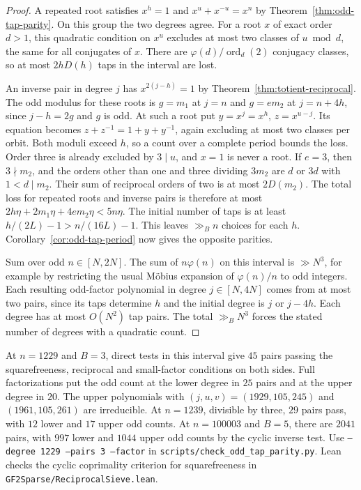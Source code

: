 \documentclass[11pt]{article}
\newcommand{\ord}{\operatorname{ord}}
\begin{document}
\begin{proof}
A repeated root satisfies \(x^h=1\) and
\(x^u+x^{-u}=x^n\) by Theorem~\ref{thm:odd-tap-parity}. On this
group the two degrees agree. For a root \(x\) of exact order
\(d>1\), this quadratic condition on \(x^u\) excludes at most
two classes of \(u\bmod d\), the same for all conjugates of \(x\).
There are \(\varphi(d)/\ord_d(2)\) conjugacy classes, so at most
\(2hD(h)\) taps in the interval are lost.

An inverse pair in degree \(j\) has \(x^{2(j-h)}=1\) by
Theorem~\ref{thm:totient-reciprocal}. The odd modulus for these
roots is \(g=m_1\) at \(j=n\) and \(g=e m_2\) at \(j=n+4h\),
since \(j-h=2g\) and \(g\) is odd. At such a root put
\(y=x^j=x^h\), \(z=x^{u-j}\). Its equation becomes
\(z+z^{-1}=1+y+y^{-1}\), again excluding at most two classes
per orbit. Both moduli exceed \(h\), so a count over a complete
period bounds the loss. Order three is already excluded by
\(3\mid u\), and \(x=1\) is never a root. If \(e=3\), then
\(3\nmid m_2\), and the orders other than one and three dividing
\(3m_2\) are \(d\) or \(3d\) with \(1<d\mid m_2\). Their sum
of reciprocal orders of two is at most \(2D(m_2)\).
The total loss for repeated roots and inverse pairs is therefore
at most \(2h\eta+2m_1\eta+4e m_2\eta<5n\eta\).
The initial number of taps is at least \(h/(2L)-1>n/(16L)-1\).
This leaves \(\gg_B n\) choices for each \(h\).
Corollary~\ref{cor:odd-tap-period} now gives the opposite parities.

Sum over odd \(n\in[N,2N]\). The sum of \(n\varphi(n)\) on this
interval is \(\gg N^3\), for example by restricting the usual
M\"obius expansion of \(\varphi(n)/n\) to odd integers.
Each resulting odd-factor polynomial in degree \(j\in[N,4N]\)
comes from at most two pairs, since its taps determine \(h\) and
the initial degree is \(j\) or \(j-4h\). Each degree has at most
\(O(N^2)\) tap pairs. The total \(\gg_B N^3\) forces the stated
number of degrees with a quadratic count.
\end{proof}

At \(n=1229\) and \(B=3\), direct tests in this interval give
\(45\) pairs passing the squarefreeness, reciprocal and small-factor
conditions on both sides. Full factorizations put the odd count
at the lower degree in \(25\) pairs and at the upper degree in
\(20\). The upper polynomials with \((j,u,v)=(1929,105,245)\)
and \((1961,105,261)\) are irreducible. At \(n=1239\), divisible
by three, \(29\) pairs pass, with \(12\) lower and \(17\) upper
odd counts. At \(n=100003\) and \(B=5\), there are \(2041\)
pairs, with \(997\) lower and \(1044\) upper odd counts by the
cyclic inverse test. Use \texttt{--degree 1229 --pairs 3 --factor} in
\nolinkurl{scripts/check_odd_tap_parity.py}. Lean checks the cyclic
coprimality criterion for squarefreeness in
\nolinkurl{GF2Sparse/ReciprocalSieve.lean}.
\end{document}
